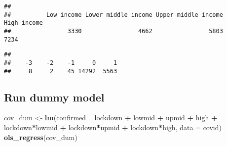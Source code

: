 \documentclass[]{article}
\newenvironment{Shaded}{\begin{snugshade}}{\end{snugshade}}
\newcommand{\KeywordTok}[1]{\textcolor[rgb]{0.13,0.29,0.53}{\textbf{#1}}}
\newcommand{\DataTypeTok}[1]{\textcolor[rgb]{0.13,0.29,0.53}{#1}}
\newcommand{\StringTok}[1]{\textcolor[rgb]{0.31,0.60,0.02}{#1}}
\newcommand{\OperatorTok}[1]{\textcolor[rgb]{0.81,0.36,0.00}{\textbf{#1}}}
\newcommand{\NormalTok}[1]{#1}
\begin{document}
\begin{verbatim}
## 
##          Low income Lower middle income Upper middle income         High income 
##                3330                4662                5803                7234
\end{verbatim}

\begin{Shaded}
\end{Shaded}

\begin{verbatim}
## 
##    -3    -2    -1     0     1 
##     8     2    45 14292  5563
\end{verbatim}

\subsection{Run dummy model}\label{run-dummy-model}

\begin{Shaded}
\begin{Highlighting}[]
\NormalTok{cov_dum <-}\StringTok{ }\KeywordTok{lm}\NormalTok{(confirmed }\OperatorTok{~}\StringTok{  }\NormalTok{lockdown }\OperatorTok{+}\StringTok{ }\NormalTok{lowmid }\OperatorTok{+}\StringTok{ }\NormalTok{upmid }\OperatorTok{+}\StringTok{ }\NormalTok{high }\OperatorTok{+}\StringTok{ }\NormalTok{lockdown}\OperatorTok{*}\NormalTok{lowmid }\OperatorTok{+}\StringTok{ }\NormalTok{lockdown}\OperatorTok{*}\NormalTok{upmid }\OperatorTok{+}\StringTok{ }\NormalTok{lockdown}\OperatorTok{*}\NormalTok{high, }
              \DataTypeTok{data =}\NormalTok{ covid)}
\KeywordTok{ols_regress}\NormalTok{(cov_dum)}
\end{Highlighting}
\end{Shaded}
\end{document}
